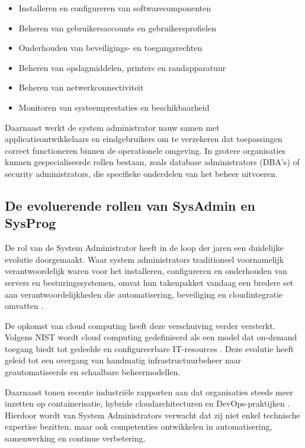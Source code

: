 \begin{itemize}
	\item Installeren en configureren van softwarecomponenten
	\item Beheren van gebruikersaccounts en gebruikersprofielen
	\item Onderhouden van beveiligings- en toegangsrechten
	\item Beheren van opslagmiddelen, printers en randapparatuur
	\item Beheren van netwerkconnectiviteit
	\item Monitoren van systeemprestaties en beschikbaarheid
\end{itemize}

Daarnaast werkt de system administrator nauw samen met applicatieontwikkelaars en eindgebruikers om te verzekeren dat toepassingen correct functioneren binnen de operationele omgeving. In grotere organisaties kunnen gespecialiseerde rollen bestaan, zoals database administrators (DBA’s) of security administrators, die specifieke onderdelen van het beheer uitvoeren. \autocite{IBM_zOS_Concepts}

\subsection{De evoluerende rollen van SysAdmin en SysProg}
\label{sec:evolution-sys-admin}

De rol van de System Administrator heeft in de loop der jaren een duidelijke evolutie doorgemaakt. Waar system administrators traditioneel voornamelijk verantwoordelijk waren voor het installeren, configureren en onderhouden van servers en besturingssystemen, omvat hun takenpakket vandaag een bredere set aan verantwoordelijkheden die automatisering, beveiliging en cloudintegratie omvatten \autocite{kim2016devops}.

De opkomst van cloud computing heeft deze verschuiving verder versterkt. Volgens NIST wordt cloud computing gedefinieerd als een model dat on-demand toegang biedt tot gedeelde en configureerbare IT-resources \autocite{mell2011nist}. Deze evolutie heeft geleid tot een overgang van handmatig infrastructuurbeheer naar geautomatiseerde en schaalbare beheermodellen.

Daarnaast tonen recente industriële rapporten aan dat organisaties steeds meer inzetten op containerisatie, hybride cloudarchitecturen en DevOps-praktijken \autocite{redhat2023state}. Hierdoor wordt van System Administrators verwacht dat zij niet enkel technische expertise bezitten, maar ook competenties ontwikkelen in automatisering, samenwerking en continue verbetering.

